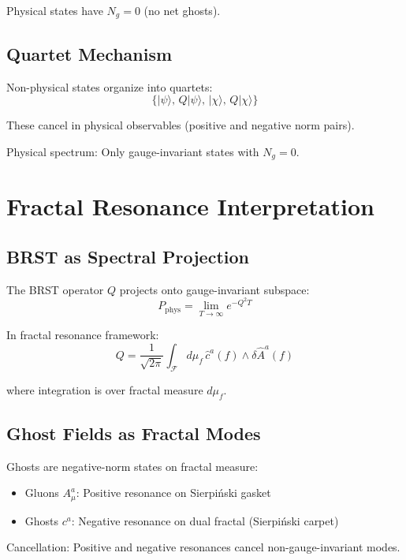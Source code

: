 Physical states have $N_g = 0$ (no net ghosts).

\subsection{Quartet Mechanism}

Non-physical states organize into quartets:
\begin{equation}
\{ |\psi\rangle, \, Q|\psi\rangle, \, |\chi\rangle, \, Q|\chi\rangle \}
\end{equation}

These cancel in physical observables (positive and negative norm pairs).

Physical spectrum: Only gauge-invariant states with $N_g = 0$.

\section{Fractal Resonance Interpretation}

\subsection{BRST as Spectral Projection}

The BRST operator $Q$ projects onto gauge-invariant subspace:
\begin{equation}
P_{\text{phys}} = \lim_{T \to \infty} e^{-Q^2 T}
\end{equation}

In fractal resonance framework:
\begin{equation}
Q = \frac{1}{\sqrt{2\pi}} \int_{\mathcal{F}} d\mu_f \, \hat{c}^a(f) \wedge \delta \hat{A}^a(f)
\end{equation}

where integration is over fractal measure $d\mu_f$.

\subsection{Ghost Fields as Fractal Modes}

Ghosts are negative-norm states on fractal measure:
\begin{itemize}
\item Gluons $A_\mu^a$: Positive resonance on Sierpiński gasket
\item Ghosts $c^a$: Negative resonance on dual fractal (Sierpiński carpet)
\end{itemize}

Cancellation: Positive and negative resonances cancel non-gauge-invariant modes.

